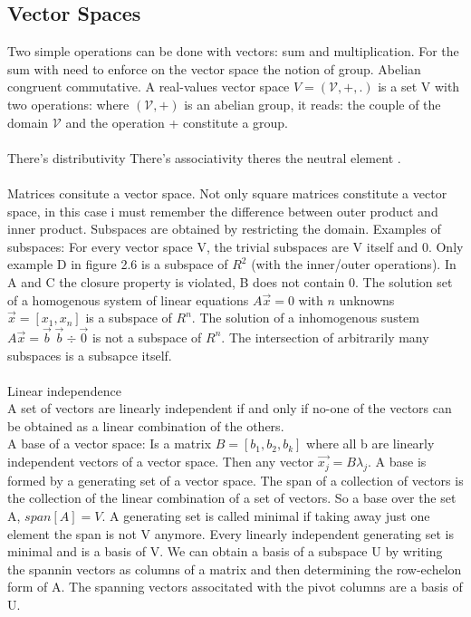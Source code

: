 \documentclass{article}
\begin{document}
\subsection*{Vector Spaces}
Two simple operations can be done with vectors: sum and multiplication. For the sum with need to enforce on the vector space the notion of group. Abelian congruent commutative.
A real-values vector space $V=(\mathcal{V},+,.)$ is a set V with two operations:
where $(\mathcal{V},+)$ is an abelian group, it reads: the couple of the domain $\mathcal{V}$ and the operation + constitute a group. \\\\
There's distributivity
There's associativity
theres the neutral element .\\\\
Matrices consitute a vector space. Not only square matrices constitute a vector space, in this case i must remember the difference between outer product and inner product. Subspaces are obtained by restricting the domain.
Examples of subspaces:
For every vector space V, the trivial subspaces are V itself and ${0}$.
Only example D in figure 2.6 is a subspace of $R^2$ (with the inner/outer operations). In A and C the closure property is violated, B does not contain 0.
The solution set of a homogenous system of linear equations $A\vec{x} = 0$ with $n$ unknowns $\vec{x} = [x_1, x_n]$ is a subspace of $R^n$. 
The solution  of a inhomogenous sustem $A\vec{x} = \vec{b} \;  \vec{b} \div \vec{0}$ is not a subspace of $R^n$. The intersection of arbitrarily many subspaces is a subsapce itself.\\\\
Linear independence\\
A set of vectors are linearly independent if and only if no-one of the vectors can be obtained as a linear combination of the others.\\
A base of a vector space:
Is a matrix $B= [b_1, b_2, b_k]$ where all b are linearly independent vectors of a vector space. Then any vector $\vec{x_j} = B \lambda_j$. A base is formed by a generating set of a vector space. The span of a collection of vectors is the collection of the linear combination of a set of vectors. So a base over the set A, $span[A] = V$. A generating set is called minimal if taking away just one element the span is not V anymore.
Every linearly independent generating set is minimal and is a basis of V.
We can obtain a basis of a subspace U by writing the spannin vectors as columns of a matrix and then determining the row-echelon form of A. The spanning vectors associtated with the pivot columns are a basis of U.\\
\end{document}
